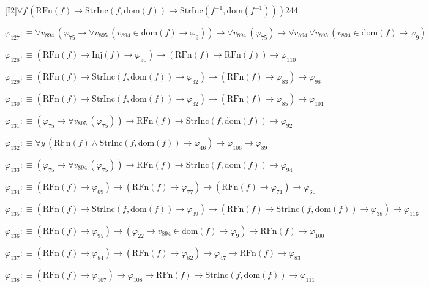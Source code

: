 \begin{fullproof}{[I2]}{$\forall f\,(\mathrm{RFn}(f) \to \mathrm{StrInc}(f,\mathrm{dom}(f)) \to \mathrm{StrInc}(f^{-1},\mathrm{dom}(f^{-1})))$}{244}
\begin{abbrevlist}
\item $\varphi_{127} :\equiv \forall v_{894}\,(\varphi_{75} \to \forall v_{895}\,(v_{894} \in \mathrm{dom}(f) \to \varphi_{9})) \to \forall v_{894}\,(\varphi_{75}) \to \forall v_{894}\,\forall v_{895}\,(v_{894} \in \mathrm{dom}(f) \to \varphi_{9})$
\item $\varphi_{128} :\equiv (\mathrm{RFn}(f) \to \mathrm{Inj}(f) \to \varphi_{90}) \to (\mathrm{RFn}(f) \to \mathrm{RFn}(f)) \to \varphi_{110}$
\item $\varphi_{129} :\equiv (\mathrm{RFn}(f) \to \mathrm{StrInc}(f,\mathrm{dom}(f)) \to \varphi_{32}) \to (\mathrm{RFn}(f) \to \varphi_{83}) \to \varphi_{98}$
\item $\varphi_{130} :\equiv (\mathrm{RFn}(f) \to \mathrm{StrInc}(f,\mathrm{dom}(f)) \to \varphi_{32}) \to (\mathrm{RFn}(f) \to \varphi_{85}) \to \varphi_{101}$
\item $\varphi_{131} :\equiv (\varphi_{75} \to \forall v_{895}\,(\varphi_{75})) \to \mathrm{RFn}(f) \to \mathrm{StrInc}(f,\mathrm{dom}(f)) \to \varphi_{92}$
\item $\varphi_{132} :\equiv \forall y\,(\mathrm{RFn}(f) \land \mathrm{StrInc}(f,\mathrm{dom}(f)) \to \varphi_{46}) \to \varphi_{106} \to \varphi_{89}$
\item $\varphi_{133} :\equiv (\varphi_{75} \to \forall v_{894}\,(\varphi_{75})) \to \mathrm{RFn}(f) \to \mathrm{StrInc}(f,\mathrm{dom}(f)) \to \varphi_{94}$
\item $\varphi_{134} :\equiv (\mathrm{RFn}(f) \to \varphi_{69}) \to (\mathrm{RFn}(f) \to \varphi_{77}) \to (\mathrm{RFn}(f) \to \varphi_{71}) \to \varphi_{60}$
\item $\varphi_{135} :\equiv (\mathrm{RFn}(f) \to \mathrm{StrInc}(f,\mathrm{dom}(f)) \to \varphi_{39}) \to (\mathrm{RFn}(f) \to \mathrm{StrInc}(f,\mathrm{dom}(f)) \to \varphi_{38}) \to \varphi_{116}$
\item $\varphi_{136} :\equiv (\mathrm{RFn}(f) \to \varphi_{95}) \to (\varphi_{22} \to v_{894} \in \mathrm{dom}(f) \to \varphi_{9}) \to \mathrm{RFn}(f) \to \varphi_{100}$
\item $\varphi_{137} :\equiv (\mathrm{RFn}(f) \to \varphi_{84}) \to (\mathrm{RFn}(f) \to \varphi_{82}) \to \varphi_{47} \to \mathrm{RFn}(f) \to \varphi_{83}$
\item $\varphi_{138} :\equiv (\mathrm{RFn}(f) \to \varphi_{107}) \to \varphi_{108} \to \mathrm{RFn}(f) \to \mathrm{StrInc}(f,\mathrm{dom}(f)) \to \varphi_{111}$
\end{abbrevlist}
\end{fullproof}
